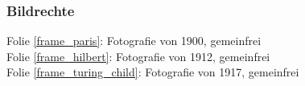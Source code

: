 \documentclass[aspectratio=1610,onlymath]{beamer}
\begin{document}
%
%
%
%
%
%
%

\begin{frame}[t]\frametitle{Bildrechte}

Folie \ref{frame_paris}: Fotografie von 1900, gemeinfrei\\
Folie \ref{frame_hilbert}: Fotografie von 1912, gemeinfrei\\
Folie \ref{frame_turing_child}: Fotografie von 1917, gemeinfrei\\

\end{frame}
\end{document}
